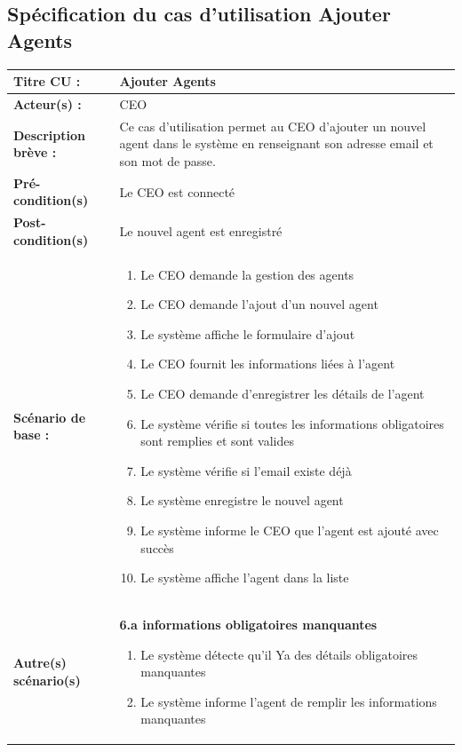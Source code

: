 \subsection{Spécification du cas d'utilisation Ajouter Agents}

\begin{table}[H]
\begin{tabularx}{\textwidth}{|l|X|}
\hline
\textbf{Titre CU :} & Ajouter Agents \\
\hline
\textbf{Acteur(s) :} & CEO \\
\hline
\textbf{Description brève :} & Ce cas d'utilisation permet au CEO d'ajouter un nouvel agent dans le système en renseignant son adresse email et son mot de passe. \\
\hline
\textbf{Pré-condition(s)} & Le CEO est connecté \\
\hline
\textbf{Post-condition(s)} & Le nouvel agent est enregistré \\
\hline
\textbf{Scénario de base :} &
\begin{enumerate}[leftmargin=1.5em, topsep=2pt, itemsep=1pt]
  \item Le CEO demande la gestion des agents
  \item Le CEO demande l'ajout d'un nouvel agent
  \item Le système affiche le formulaire d'ajout
  \item Le CEO fournit les informations liées à l'agent
  \item Le CEO demande d'enregistrer les détails de l'agent
  \item Le système vérifie si toutes les informations obligatoires sont remplies et sont valides
  \item Le système vérifie si l'email existe déjà
  \item Le système enregistre le nouvel agent
  \item Le système informe le CEO que l'agent est ajouté avec succès
  \item Le système affiche l'agent dans la liste
\end{enumerate} \\
\hline
\textbf{Autre(s) scénario(s)} &
\textbf{6.a informations obligatoires manquantes}
\begin{enumerate}[leftmargin=1.5em, topsep=2pt, itemsep=1pt]
  \item Le système détecte qu'il Ya des détails obligatoires manquantes
  \item Le système informe l'agent de remplir les informations manquantes

\end{enumerate}
\end{tabularx}
\end{table}
